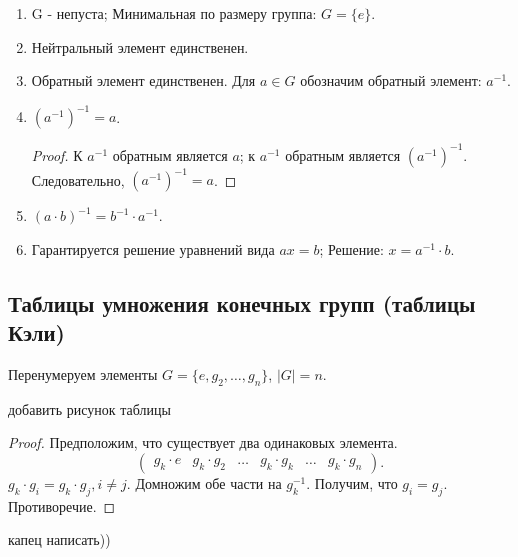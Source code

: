 \documentclass[12pt,a4paper]{report}
\begin{document}
\begin{enumerate}
    \item G - непуста;
    Минимальная по размеру группа: $G=\{e\}$.
    \item Нейтральный элемент единственен.
    \item Обратный элемент единственен.
    Для $a\in G$ обозначим обратный элемент: $a^{-1}$.
    \item $(a^{-1})^{-1}=a$.
    \begin{proof}
        К $a^{-1}$ обратным является $a$; к $a^{-1}$ обратным является $(a^{-1})^{-1}$. Следовательно, $(a^{-1})^{-1}=a$.
    \end{proof}
    \item $(a\cdot b)^{-1} = b^{-1}\cdot a^{-1}$.
    \item Гарантируется решение уравнений вида $ax=b$;
    Решение: $x=a^{-1}\cdot b$.
\end{enumerate}


\subsection{Таблицы умножения конечных групп (таблицы Кэли)}
Перенумеруем элементы $G=\{e, g_2,\dots,g_n\}$, $|G|=n$.

добавить рисунок таблицы

\begin{proof}
    Предположим, что существует два одинаковых элемента.
    \[\begin{pmatrix}g_k\cdot e & g_k\cdot g_2 & \dots & g_k\cdot g_k & \dots &g_k\cdot g_n\end{pmatrix}.\]
    $g_k\cdot g_i=g_k\cdot g_j, i\neq j$.
    Домножим обе части на $g_k^{-1}$.
    Получим, что $g_i=g_j$. Противоречие.
\end{proof}

капец написать))

\end{document}
